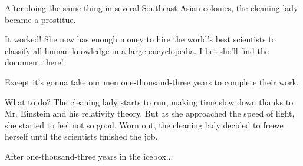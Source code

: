 \documentclass[a4paper]{article}
\begin{document}
\begin{comment}
Sauf que l'on a fait tomber le document et la femme de ménage, toujours
diligente, l’a ramassé et l’a jeté dans la poubelle.
\end{comment}

After doing the same thing in several Southeast Asian colonies, the
cleaning lady became a prostitue.

\begin{comment}
Après avoir refait le même exercice dans plusieurs colonies en Asie du Sud,
la femme de ménage s’est livrée à la prostitution.
\end{comment}

It worked!  She now has enough money to hire the world's best scientists to
classify all human knowledge in a large encyclopedia.  I bet she'll find the
document there!

\begin{comment}
Ça a bien marché ! On a suffisamment d’argent pour embaucher une équipe de
chercheurs qui classifiera toutes les connaissances humaines dans une
grande encyclopédie. Je mettrais ma main à couper qu'elle y trouve le
document !
\end{comment}

Except it's gonna take our men one-thousand-three years to complete their work.

\begin{comment}
Sauf qu’il leur faudra 1 003 ans pour finir le projet!
\end{comment}

What to do?  The cleaning lady starts to run, making time slow down thanks
to Mr. Einstein and his relativity theory.  But as she approached the speed
of light, she started to feel not so good.  Worn out, the cleaning lady
decided to freeze herself until the scientists finished the job.

\begin{comment}
Que faire? La femme de ménage
commence à courir, faisant ralentir le temps selon la théorie
de la relativité. Mais au moment de frôler la vitesse de la lumière, la fatigue
commence à s'installer. Epuisée, la femme de ménage décide de se congeler en
attendant que les recherches s'achèvent.
\end{comment}

After one-thousand-three years in the icebox...

\begin{comment}
Au bout de 1 003 ans de gel…
\end{comment}
\end{document}
